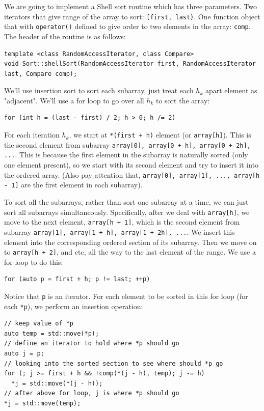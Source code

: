 \documentclass[12pt]{book}
\begin{document}
We are going to implement a Shell sort routine which has three parameters. Two iterators that give range of the array to sort: \texttt{[first, last)}. One function object that with \texttt{operator()} defined to give order to two elements in the array: \texttt{comp}. The header of the routine is as follows:
\begin{verbatim}
template <class RandomAccessIterator, class Compare>
void Sort::shellSort(RandomAccessIterator first, RandomAccessIterator last, Compare comp);
\end{verbatim}
We'll use insertion sort to sort each subarray, just treat each \(h_k\) apart element as "adjacent". We'll use a for loop to go over all \(h_k\) to sort the array:
\begin{verbatim}
for (int h = (last - first) / 2; h > 0; h /= 2)
\end{verbatim}

For each iteration \(h_k\), we start at \texttt{*(first + h)} element (or \texttt{array[h]}). This is the second element from subarray \texttt{array[0], array[0 + h], array[0 + 2h], ...}. This is because the first element in the subarray is naturally sorted (only one element present), so we start with its second element and try to insert it into the ordered array. (Also pay attention that, \texttt{array[0], array[1], ..., array[h - 1]} are the first element in each subarray).

To sort all the subarrays, rather than sort one subarray at a time, we can just sort all subarrays simultaneously. Specifically, after we deal with \texttt{array[h]}, we move to the next element, \texttt{array[h + 1]}, which is the second element from subarray \texttt{array[1], array[1 + h], array[1 + 2h], ...}. We insert this element into the corresponding ordered section of its subarray. Then we move on to \texttt{array[h + 2]}, and etc, all the way to the last element of the range. We use a for loop to do this:
\begin{verbatim}
for (auto p = first + h; p != last; ++p)
\end{verbatim}

Notice that \texttt{p} is an iterator. For each element to be sorted in this for loop (for each \texttt{*p}), we perform an insertion operation:
\begin{verbatim}
// keep value of *p
auto temp = std::move(*p);
// define an iterator to hold where *p should go
auto j = p;
// looking into the sorted section to see where should *p go
for (; j >= first + h && !comp(*(j - h), temp); j -= h)
  *j = std::move(*(j - h));
// after above for loop, j is where *p should go
*j = std::move(temp);
\end{verbatim}
\end{document}
